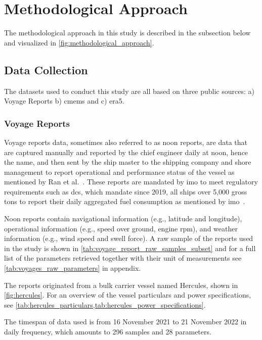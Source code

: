 \section{Methodological Approach}\label{sec:methodological_approach}
The methodological approach in this study is described in the subsection below and visualized in \cref{fig:methodological_approach}. 

\subsection{Data Collection}\label{sec:data_collection}
The datasets used to conduct this study are all based on three public sources: a) Voyage Reports b) \ac{cmems} and c) \ac{era5}. 

\subsubsection{Voyage Reports}\label{sec:voyage_reports}
Voyage reports data, sometimes also referred to as noon reports, are data that are captured manually and reported by the chief engineer daily at noon, hence the name, and then sent by the ship master to the shipping company and shore management to report operational and performance status of the vessel as mentioned by Ran et al.~\citep{YAN2021102489}. These reports are mandated by \ac{imo} to meet regulatory requirements such as \ac{dcs}, which mandate since 2019, all ships over 5,000 gross tons to report their daily aggregated fuel consumption as mentioned by \ac{imo}~\citep{imoIMODataCollection2023}. 

Noon reports contain navigational information (e.g., latitude and longitude), operational information (e.g., speed over ground, engine rpm), and weather information (e.g., wind speed and swell force). A raw sample of the reports used in the study is shown in \cref{tab:voyage_report_raw_samples_subset} and for a full list of the parameters retrieved together with their unit of measurements see \ref{tab:voyages_raw_parameters} in appendix. 

\clearpage


The reports originated from a bulk carrier vessel named Hercules, shown in \cref{fig:hercules}. 
For an overview of the vessel particulars and power specifications, see \cref{tab:hercules_particulars,tab:hercules_power_specifications}. 



The timespan of data used is from 16 November 2021 to 21 November 2022 in daily frequency, which amounts to 296 samples and 28 parameters. 

